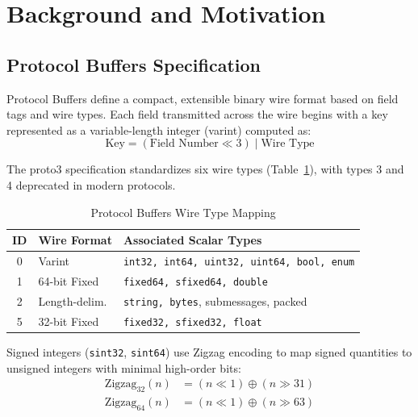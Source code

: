 \section{Background and Motivation}

\subsection{Protocol Buffers Specification}
Protocol Buffers define a compact, extensible binary wire format based on field tags and wire types. Each field transmitted across the wire begins with a key represented as a variable-length integer (varint) computed as:
\begin{equation}
\text{Key} = (\text{Field Number} \ll 3) \mid \text{Wire Type}
\label{eq:wire_key}
\end{equation}

The proto3 specification standardizes six wire types (Table~\ref{tab:wire_types}), with types 3 and 4 deprecated in modern protocols.

\begin{table}[ht]
\centering
\caption{Protocol Buffers Wire Type Mapping}
\label{tab:wire_types}
\renewcommand{\arraystretch}{1.15}
\setlength{\tabcolsep}{2.5pt}
\scriptsize
\begin{tabular}{|c|l|p{4.2cm}|}
\hline
\textbf{ID} & \textbf{Wire Format} & \textbf{Associated Scalar Types} \\ \hline
0 & Varint & \raggedright \texttt{int32, int64, uint32, uint64, bool, enum} \tabularnewline \hline
1 & 64-bit Fixed & \texttt{fixed64, sfixed64, double} \\ \hline
2 & Length-delim. & \texttt{string, bytes}, submessages, packed \\ \hline
5 & 32-bit Fixed & \texttt{fixed32, sfixed32, float} \\ \hline
\end{tabular}
\end{table}

Signed integers (\texttt{sint32}, \texttt{sint64}) use Zigzag encoding to map signed quantities to unsigned integers with minimal high-order bits:
\begin{align}
\text{Zigzag}_{32}(n) &= (n \ll 1) \oplus (n \gg 31) \\
\text{Zigzag}_{64}(n) &= (n \ll 1) \oplus (n \gg 63)
\end{align}


